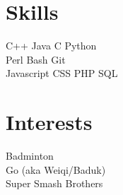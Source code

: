 \documentclass[letter]{deedy-resume} %
\begin{document}
\begin{minipage}[t]{0.33\textwidth}

\section{Skills}


C++ \textbullet{} Java \textbullet{} C \textbullet{} Python \\
Perl \textbullet{} Bash \textbullet{} Git \\ 
Javascript \textbullet{} CSS \textbullet{} PHP \textbullet{} SQL \\

\sectionspace %


\section{Interests}

Badminton \\
Go (aka Weiqi/Baduk) \\
Super Smash Brothers \\

\sectionspace %


\end{minipage} %
\hfill
%
%
\end{document}
